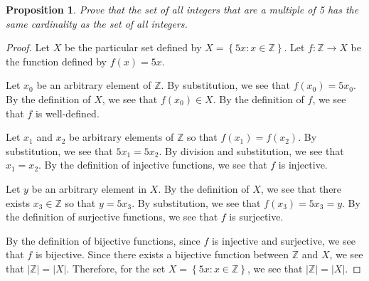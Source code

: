 \documentclass{amsart}
\newtheorem*{proposition}{Proposition}
\newcommand{\set}[1]{\left\{#1\right\}}
\newcommand{\abs}[1]{\left|#1\right|}
\newcommand{\Z}{\mathbb{Z}}
\numberwithin{equation}{section}
\begin{document}
	\begin{problem}[manual-num=64]
		\begin{proposition}
			Prove that the set of all integers that are a multiple of 5 has the same cardinality as the set of all integers.
		\end{proposition}

		\begin{proof}
			Let $X$ be the particular set defined by $X = \set{5x : x \in \Z}$.
			Let $f : \Z \rightarrow X$ be the function defined by $f(x) = 5x$.

			Let $x_0$ be an arbitrary element of $\Z$.
			By substitution, we see that $f(x_0) = 5x_0$.
			By the definition of $X$, we see that $f(x_0) \in X$.
			By the definition of $f$, we see that $f$ is well-defined.

			Let $x_1$ and $x_2$ be arbitrary elements of $\Z$ so that $f(x_1) = f(x_2)$.
			By substitution, we see that $5x_1 = 5x_2$.
			By division and substitution, we see that $x_1 = x_2$.
			By the definition of injective functions, we see that $f$ is injective.

			Let $y$ be an arbitrary element in $X$.
			By the definition of $X$, we see that there exists $x_3 \in \Z$ so that $y = 5x_3$.
			By substitution, we see that $f(x_3) = 5x_3 = y$.
			By the definition of surjective functions, we see that $f$ is surjective.

			By the definition of bijective functions, since $f$ is injective and surjective, we see that $f$ is bijective.
			Since there exists a bijective function between $\Z$ and $X$, we see that $\abs{\Z} = \abs{X}$.
			Therefore, for the set $X = \set{5x : x \in \Z}$, we see that $\abs{\Z} = \abs{X}$.
		\end{proof}
	\end{problem}
\end{document}

